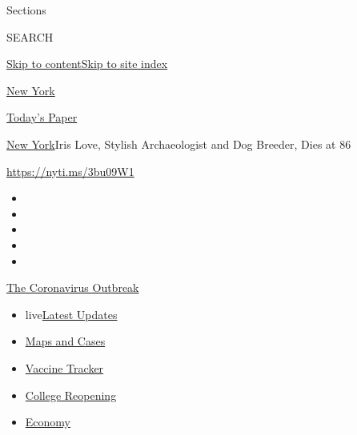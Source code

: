 Sections

SEARCH

\protect\hyperlink{site-content}{Skip to
content}\protect\hyperlink{site-index}{Skip to site index}

\href{https://www.nytimes3xbfgragh.onion/section/nyregion}{New York}

\href{https://myaccount.nytimes3xbfgragh.onion/auth/login?response_type=cookie\&client_id=vi}{}

\href{https://www.nytimes3xbfgragh.onion/section/todayspaper}{Today's
Paper}

\href{/section/nyregion}{New York}\textbar{}Iris Love, Stylish
Archaeologist and Dog Breeder, Dies at 86

\url{https://nyti.ms/3bu09W1}

\begin{itemize}
\item
\item
\item
\item
\item
\end{itemize}

\href{https://www.nytimes3xbfgragh.onion/news-event/coronavirus?action=click\&pgtype=Article\&state=default\&region=TOP_BANNER\&context=storylines_menu}{The
Coronavirus Outbreak}

\begin{itemize}
\tightlist
\item
  live\href{https://www.nytimes3xbfgragh.onion/2020/08/04/world/coronavirus-covid-19.html?action=click\&pgtype=Article\&state=default\&region=TOP_BANNER\&context=storylines_menu}{Latest
  Updates}
\item
  \href{https://www.nytimes3xbfgragh.onion/interactive/2020/us/coronavirus-us-cases.html?action=click\&pgtype=Article\&state=default\&region=TOP_BANNER\&context=storylines_menu}{Maps
  and Cases}
\item
  \href{https://www.nytimes3xbfgragh.onion/interactive/2020/science/coronavirus-vaccine-tracker.html?action=click\&pgtype=Article\&state=default\&region=TOP_BANNER\&context=storylines_menu}{Vaccine
  Tracker}
\item
  \href{https://www.nytimes3xbfgragh.onion/2020/08/02/us/covid-college-reopening.html?action=click\&pgtype=Article\&state=default\&region=TOP_BANNER\&context=storylines_menu}{College
  Reopening}
\item
  \href{https://www.nytimes3xbfgragh.onion/live/2020/08/03/business/stock-market-today-coronavirus?action=click\&pgtype=Article\&state=default\&region=TOP_BANNER\&context=storylines_menu}{Economy}
\end{itemize}

